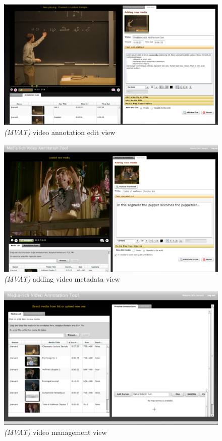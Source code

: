 \begin{figure}[!ht]
	\includegraphics[width=\textwidth]{gfx/mvat/mvat-annotation-edit-view.png}
	\caption{\textit{(MVAT)} video annotation edit view} 
	\label{fig:mvat:video-annotation-edit-view}
\end{figure} 

\begin{figure}[!ht]
	\includegraphics[width=\textwidth]{gfx/mvat/mvat-loading-video-adding-metadata.png}
	\caption{\textit{(MVAT)} adding video metadata view} 
	\label{fig:mvat:adding-video-metadata}
\end{figure} 

\begin{figure}[!ht]
	\includegraphics[width=\textwidth]{gfx/mvat/mvat-video-management}
	\caption{\textit{(MVAT)} video management view} 
	\label{fig:mvat:video-management-view}
\end{figure}

